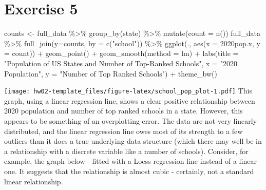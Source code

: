 \documentclass[
]{article}
\newenvironment{Shaded}{\begin{snugshade}}{\end{snugshade}}
\newcommand{\AttributeTok}[1]{\textcolor[rgb]{0.77,0.63,0.00}{#1}}
\newcommand{\FunctionTok}[1]{\textcolor[rgb]{0.00,0.00,0.00}{#1}}
\newcommand{\NormalTok}[1]{#1}
\newcommand{\OtherTok}[1]{\textcolor[rgb]{0.56,0.35,0.01}{#1}}
\newcommand{\SpecialCharTok}[1]{\textcolor[rgb]{0.00,0.00,0.00}{#1}}
\newcommand{\StringTok}[1]{\textcolor[rgb]{0.31,0.60,0.02}{#1}}
\begin{document}
\hypertarget{exercise-5}{%
\section{Exercise 5}\label{exercise-5}}

\begin{Shaded}
\begin{Highlighting}[]
\NormalTok{counts }\OtherTok{\textless{}{-}}\NormalTok{ full\_data }\SpecialCharTok{\%\textgreater{}\%}
  \FunctionTok{group\_by}\NormalTok{(state) }\SpecialCharTok{\%\textgreater{}\%} 
  \FunctionTok{mutate}\NormalTok{(}\AttributeTok{count =} \FunctionTok{n}\NormalTok{())}
\NormalTok{full\_data }\SpecialCharTok{\%\textgreater{}\%}
  \FunctionTok{full\_join}\NormalTok{(}\AttributeTok{y=}\NormalTok{counts, }\AttributeTok{by =} \FunctionTok{c}\NormalTok{(}\StringTok{"school"}\NormalTok{)) }\SpecialCharTok{\%\textgreater{}\%}
  \FunctionTok{ggplot}\NormalTok{(., }\FunctionTok{aes}\NormalTok{(}\AttributeTok{x =} \StringTok{\textasciigrave{}}\AttributeTok{2020pop.x}\StringTok{\textasciigrave{}}\NormalTok{, }\AttributeTok{y =}\NormalTok{ count)) }\SpecialCharTok{+}
  \FunctionTok{geom\_point}\NormalTok{() }\SpecialCharTok{+}
  \FunctionTok{geom\_smooth}\NormalTok{(}\AttributeTok{method =}\NormalTok{ lm) }\SpecialCharTok{+}
  \FunctionTok{labs}\NormalTok{(}\AttributeTok{title =} \StringTok{"Population of US States and Number of Top{-}Ranked Schools"}\NormalTok{,}
       \AttributeTok{x =} \StringTok{"2020 Population"}\NormalTok{, }\AttributeTok{y =} \StringTok{"Number of Top Ranked Schools"}\NormalTok{) }\SpecialCharTok{+}
  \FunctionTok{theme\_bw}\NormalTok{()}
\end{Highlighting}
\end{Shaded}

\texttt{[image: hw02-template\_files/figure-latex/school\_pop\_plot-1.pdf]}
This graph, using a linear regression line, shows a clear positive
relationship between 2020 population and number of top ranked schools in
a state. However, this appears to be something of an overplotting error.
The data are not very linearly distributed, and the linear regression
line owes most of its strength to a few outliers than it does a true
underlying data structure (which there may well be in a relationship
with a discrete variable like a number of schools). Consider, for
example, the graph below - fitted with a Loess regression line instead
of a linear one. It suggests that the relationship is almost cubic -
certainly, not a standard linear relationship.
\end{document}
